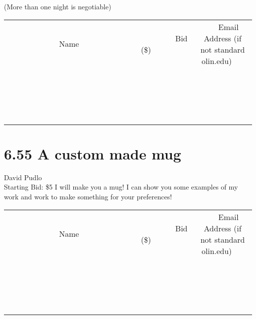 \documentclass[11pt]{article}
\begin{document}
(More than one night is negotiable)
\\[3ex]
\begin{tabular}{c c c}
~~~~~~~~~~~~~Name~~~~~~~~~~~~~ & ~~~~~~~~~Bid (\$)~~~~~~~~~  & ~~~Email Address (if not standard olin.edu)~~~\\
 & & \\
\hline
 & & \\
\hline
 & & \\
\hline
 & & \\
\hline
 & & \\
\hline
 & & \\
\hline
 & & \\
\hline
 & & \\
\hline
 & & \\
\hline
 & & \\
\hline
 & & \\
\hline
 & & \\
\hline
 & & \\
\hline
 & & \\
\hline
 & & \\
\hline
 & & \\
\hline
 & & \\
\hline
 & & \\
\hline
 & & \\
\hline
\end{tabular}
\newpage
\section*{6.55 A custom made mug}
David Pudlo
\\
Starting Bid: \$5
\newline
I will make you a mug! I can show you some examples of my work and work to make something for your preferences!
\\[3ex]
\begin{tabular}{c c c}
~~~~~~~~~~~~~Name~~~~~~~~~~~~~ & ~~~~~~~~~Bid (\$)~~~~~~~~~  & ~~~Email Address (if not standard olin.edu)~~~\\
 & & \\
\hline
 & & \\
\hline
 & & \\
\hline
 & & \\
\hline
 & & \\
\hline
 & & \\
\hline
 & & \\
\hline
 & & \\
\hline
 & & \\
\hline
 & & \\
\hline
 & & \\
\hline
 & & \\
\hline
 & & \\
\hline
 & & \\
\hline
 & & \\
\hline
 & & \\
\hline
 & & \\
\hline
 & & \\
\hline
 & & \\
\hline
\end{tabular}
\newpage
\end{document}
